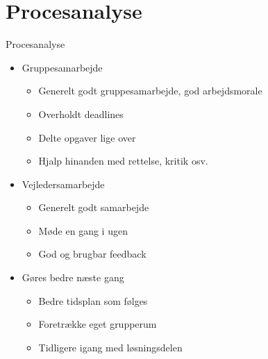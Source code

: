 \section{Procesanalyse}
\begin{frame}{Procesanalyse}{}
\begin{itemize}
\item Gruppesamarbejde
\begin{itemize}
\item Generelt godt gruppesamarbejde, god arbejdsmorale
\item Overholdt deadlines
\item Delte opgaver lige over
\item Hjalp hinanden med rettelse, kritik osv.
\end{itemize}
\item Vejledersamarbejde
\begin{itemize}
\item Generelt godt samarbejde
\item Møde en gang i ugen
\item God og brugbar feedback
\end{itemize}
\item Gøres bedre næste gang
\begin{itemize}
\item Bedre tidsplan som følges
\item Foretrække eget grupperum
\item Tidligere igang med løsningsdelen
\end{itemize}
\end{itemize}
\end{frame}